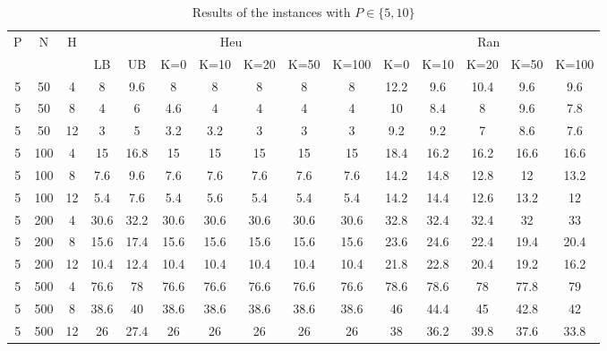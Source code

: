 \documentclass[review,3p,times,authoryear,12pt]{elsarticle}
\begin{document}
\begin{table}[htbp]
\footnotesize
  \centering
  \setlength{\belowcaptionskip}{10pt}
  \caption{Results of the instances with $P\in\{5, 10\}$}
  \begin{tabular}{ccccccccccccccc}
  \hline
  \multicolumn{1}{c}{\multirow{2}{*}{P}}
  & \multicolumn{1}{c}{\multirow{2}{*}{N}}
  & \multicolumn{1}{c}{\multirow{2}{*}{H}}
  & \multicolumn{7}{c}{Heu}
  & \multicolumn{5}{c}{Ran}\\
  \cline{4-15}
  \multicolumn{1}{c}{}
  &\multicolumn{1}{c}{}
  &\multicolumn{1}{c}{}
  &\multicolumn{1}{c}{LB}&{UB}&{K=0}&{K=10}&{K=20}&{K=50}&{K=100}
  &\multicolumn{1}{c}{K=0}&{K=10}&{K=20}&{K=50}&{K=100}\\
  \hline

    5     & 50    & 4     & 8     & 9.6   & 8     & 8     & 8     & 8     & 8     & 12.2  & 9.6   & 10.4  & 9.6   & 9.6 \\
    5     & 50    & 8     & 4     & 6     & 4.6   & 4     & 4     & 4     & 4     & 10    & 8.4   & 8     & 9.6   & 7.8 \\
    5     & 50    & 12    & 3     & 5     & 3.2   & 3.2   & 3     & 3     & 3     & 9.2   & 9.2   & 7     & 8.6   & 7.6 \\
    5     & 100   & 4     & 15    & 16.8  & 15    & 15    & 15    & 15    & 15    & 18.4  & 16.2  & 16.2  & 16.6  & 16.6 \\
    5     & 100   & 8     & 7.6   & 9.6   & 7.6   & 7.6   & 7.6   & 7.6   & 7.6   & 14.2  & 14.8  & 12.8  & 12    & 13.2 \\
    5     & 100   & 12    & 5.4   & 7.6   & 5.4   & 5.6   & 5.4   & 5.4   & 5.4   & 14.2  & 14.4  & 12.6  & 13.2  & 12 \\
    5     & 200   & 4     & 30.6  & 32.2  & 30.6  & 30.6  & 30.6  & 30.6  & 30.6  & 32.8  & 32.4  & 32.4  & 32    & 33 \\
    5     & 200   & 8     & 15.6  & 17.4  & 15.6  & 15.6  & 15.6  & 15.6  & 15.6  & 23.6  & 24.6  & 22.4  & 19.4  & 20.4 \\
    5     & 200   & 12    & 10.4  & 12.4  & 10.4  & 10.4  & 10.4  & 10.4  & 10.4  & 21.8  & 22.8  & 20.4  & 19.2  & 16.2 \\
    5     & 500   & 4     & 76.6  & 78    & 76.6  & 76.6  & 76.6  & 76.6  & 76.6  & 78.6  & 78.6  & 78    & 77.8  & 79 \\
    5     & 500   & 8     & 38.6  & 40    & 38.6  & 38.6  & 38.6  & 38.6  & 38.6  & 46    & 44.4  & 45    & 42.8  & 42 \\
    5     & 500   & 12    & 26    & 27.4  & 26    & 26    & 26    & 26    & 26    & 38    & 36.2  & 39.8  & 37.6  & 33.8 \\

\end{tabular}
\end{table}
\end{document}
